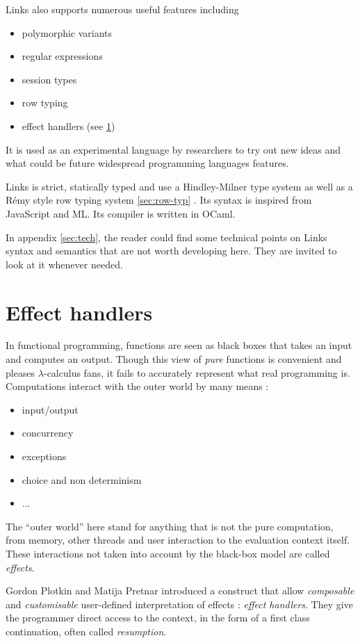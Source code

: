 \documentclass[11pt, nonacm=true, language=french, language=english]{acmart}
\begin{document}
Links also supports numerous useful features including
\begin{itemize}
  \item polymorphic variants
  \item regular expressions
  \item session types
  \item row typing
  \item effect handlers (see \ref{sec:handlers})
\end{itemize}
It is used as an experimental language by researchers to try out new ideas and what could be future widespread programming languages features.

Links is strict, statically typed and use a Hindley-Milner type system as well as a Rémy style row typing system \ref{sec:row-typ} \citep{row-typ}. Its syntax is inspired from JavaScript and ML. Its compiler \citep{gh:links} is written in OCaml.

\begin{rem}
  In appendix \ref{sec:tech}, the reader could find some technical points on Links syntax and semantics that are not worth developing here. They are invited to look at it whenever needed.
\end{rem}

\section{Effect handlers}
\label{sec:handlers}

In functional programming, functions are seen as black boxes that takes an input and computes an output. Though this view of \emph{pure} functions is convenient and pleases $\lambda$-calculus fans, it fails to accurately represent what real programming is. Computations interact with the outer world by many means :
\begin{itemize}
  \item input/output
  \item concurrency
  \item exceptions
  \item choice and non determinism
  \item ...
\end{itemize}
The ``outer world'' here stand for anything that is not the pure computation, from memory, other threads and user interaction to the evaluation context itself.
These interactions not taken into account by the black-box model are called \emph{effects}.

Gordon Plotkin and Matija Pretnar \citep{plotkin-pretnar} introduced a construct that allow \emph{composable} and \emph{customisable} user-defined interpretation of effects : \emph{effect handlers}. They give the programmer direct access to the context, in the form of a first class continuation, often called \emph{resumption}.
\end{document}
